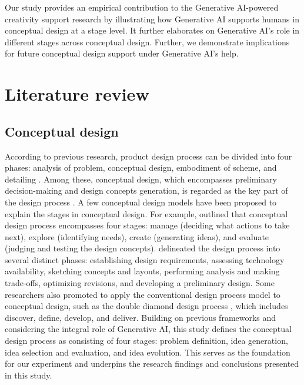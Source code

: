 \documentclass{dsj}
\begin{document}
Our study provides an empirical contribution to the Generative AI-powered creativity support research by illustrating how Generative AI supports humans in conceptual design at a stage level. It further elaborates on Generative AI’s role in different stages across conceptual design. Further, we demonstrate implications for future conceptual design support under Generative AI’s help.

\section{Literature review}
\subsection{Conceptual design}

According to previous research, product design process can be divided into four phases: analysis of problem, conceptual design, embodiment of scheme, and detailing \citep{french1985conceptual}. Among these, conceptual design, which encompasses preliminary decision-making and design concepts generation, is regarded as the key part of the design process \citep{eppinger1995product}. A few conceptual design models have been proposed to explain the stages in conceptual design. For example, \cite{goodman2016designing} outlined that conceptual design process encompasses four stages: manage (deciding what actions to take next), explore (identifying needs), create (generating ideas), and evaluate (judging and testing the design concepts). \cite{Jasmine2020} delineated the design process into several distinct phases: establishing design requirements, assessing technology availability, sketching concepts and layouts, performing analysis and making trade-offs, optimizing revisions, and developing a preliminary design. Some researchers also promoted to apply the conventional design process model to conceptual design, such as the double diamond design process \citep{DesignCouncil2019}, which includes discover, define, develop, and deliver. Building on previous frameworks and considering the integral role of Generative AI, this study defines the conceptual design process as consisting of four stages: problem definition, idea generation, idea selection and evaluation, and idea evolution. This serves as the foundation for our experiment and underpins the research findings and conclusions presented in this study.
\end{document}
